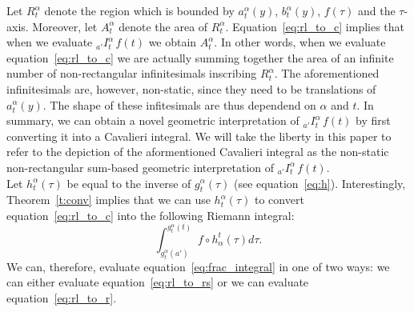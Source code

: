 \documentclass[twoside,reqno,11pt]{fcaa-var} %
\begin{document}
\noindent
Let $R_t^{\alpha}$ denote the region which is bounded by $a_t^{\alpha}(y)$, $b_t^{\alpha}(y)$, $f(\tau)$ and the $\tau$-axis. Moreover, let $A_{t}^{\alpha}$ denote the area of $R_t^{\alpha}$. Equation~\eqref{eq:rl_to_c} implies that when we evaluate $_{a'}I_t^{\alpha}\,f(t)$ we obtain $A_{t}^{\alpha}$. In other words, when we evaluate equation~\eqref{eq:rl_to_c} we are actually summing together the area of an infinite number of non-rectangular infinitesimals inscribing $R_t^{\alpha}$. The aforementioned infinitesimals are, however, non-static, since they need to be translations of $a_t^{\alpha}(y)$. The shape of these infitesimals are thus dependend on $\alpha$ and $t$. In summary, we can obtain a novel geometric interpretation of 
$_{a'}I_t^{\alpha}\,f(t)$ by first converting it into a Cavalieri integral. We will take the liberty in this paper to refer to the depiction of the aformentioned Cavalieri integral as the non-static non-rectangular sum-based geometric interpretation of $_{a'}I_t^{\alpha}\,f(t)$.\\


\noindent
Let $h_t^{\alpha}(\tau)$ be equal to the inverse of $g_t^{\alpha}(\tau)$ (see equation~\eqref{eq:h}). Interestingly, Theorem~\ref{t:conv} implies that we can use $h_t^{\alpha}(\tau)$ to convert equation~\eqref{eq:rl_to_c} into the following Riemann integral:
\begin{equation}
\label{eq:rl_to_r}
\int_{g_t^{\alpha}(a')}^{g_t^{\alpha}(t)} f\circ h_{\alpha}^t (\tau) d\tau.  
\end{equation}
We can, therefore, evaluate equation~\eqref{eq:frac_integral} in one of two ways: we can either evaluate equation~\eqref{eq:rl_to_rs} or we can evaluate equation~\eqref{eq:rl_to_r}.\\
\end{document}

